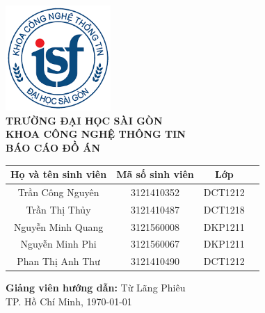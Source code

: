 \documentclass[a4paper,12pt]{report}
\begin{document}
\begin{titlepage}
    \centering
    \includegraphics[width=4cm]{imgs/logoITSGU.png} \\[1cm]
    \textbf{\Large TRƯỜNG ĐẠI HỌC SÀI GÒN} \\[0.5cm]
    \textbf{\Large KHOA CÔNG NGHỆ THÔNG TIN} \\[2cm]
    {\Huge \textbf{BÁO CÁO ĐỒ ÁN}} \\[2cm]

    \begin{center}
        \begin{tabular}{|c|c|c|c|}
            \hline
            \textbf{Họ và tên sinh viên} & \textbf{Mã số sinh viên} & \textbf{Lớp}   \\
            \hline
            Trần Công Nguyên & 3121410352 & DCT1212  \\
            \hline
            Trần Thị Thủy & 3121410487 & DCT1218  \\
            \hline
            Nguyễn Minh Quang & 3121560008 & DKP1211  \\
            \hline
            Nguyễn Minh Phi & 3121560067 & DKP1211  \\
            \hline
            Phan Thị Anh Thư & 3121410490 & DCT1212 \\
            \hline
        \end{tabular}
    \end{center}
    
    \vspace{1cm}
    \textbf{Giảng viên hướng dẫn:} Từ Lãng Phiêu \\

    \vfill
    TP. Hồ Chí Minh, \today
\end{titlepage}

\newpage
\tableofcontents
\end{document}
